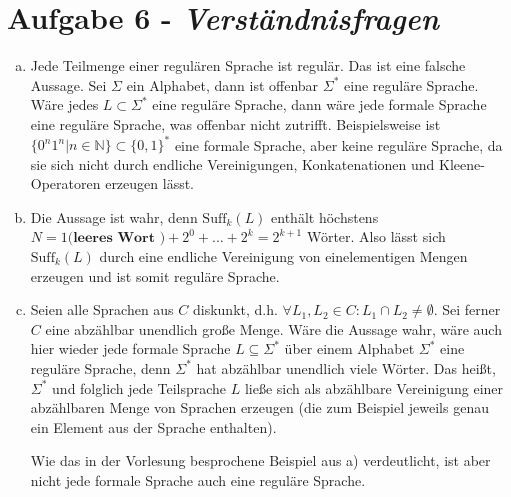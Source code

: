\documentclass{article}
\begin{document}
\section*{Aufgabe 6 - \textit{Verständnisfragen}}
\begin{enumerate}[a)]
	\item Jede Teilmenge einer regulären Sprache ist regulär. Das ist eine falsche Aussage. Sei $\Sigma$ ein Alphabet, dann ist offenbar $\Sigma^*$ eine reguläre Sprache. Wäre jedes $L \subset \Sigma^*$ eine reguläre Sprache, dann wäre jede formale Sprache eine reguläre Sprache, was offenbar nicht zutrifft. Beispielsweise ist $\{0^n 1^n | n \in \mathbb{N}\} \subset \{0,1\}^*$ eine formale Sprache, aber keine reguläre Sprache, da sie sich nicht durch endliche Vereinigungen, Konkatenationen und Kleene-Operatoren erzeugen lässt. 
	
	\item Die Aussage ist wahr, denn $\text{Suff}_k(L)$ enthält höchstens $N = 1 \textbf{(leeres Wort )} + 2^0 + ... + 2^k = 2^{k+1}$ Wörter. Also lässt sich $\text{Suff}_k(L)$ durch eine endliche Vereinigung von einelementigen Mengen erzeugen und ist somit reguläre Sprache.
	
	\item Seien alle Sprachen aus $C$ diskunkt, d.h. $\forall L_1, L_2 \in C: L_1 \cap L_2 \neq \emptyset$. Sei ferner $C$ eine abzählbar unendlich große Menge. Wäre die Aussage wahr, wäre auch hier wieder jede formale Sprache $L \subseteq \Sigma^*$ über einem Alphabet $\Sigma^*$ eine reguläre Sprache, denn $\Sigma^*$ hat abzählbar unendlich viele Wörter. Das heißt, $\Sigma^*$ und folglich jede Teilsprache $L$ ließe sich als abzählbare Vereinigung einer abzählbaren Menge von Sprachen erzeugen (die zum Beispiel jeweils genau ein Element aus der Sprache enthalten).
	
	Wie das in der Vorlesung besprochene Beispiel aus a) verdeutlicht, ist aber nicht jede formale Sprache auch eine reguläre Sprache.
	
\end{enumerate}
	
	
	
	
\end{document}
